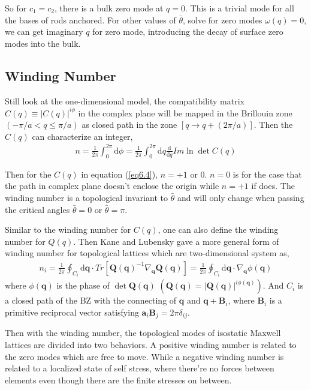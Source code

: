 \documentclass[aps,pre,preprint,groupedaddress]{revtex4-1}
\begin{document}
So for $c_1 = c_2$, there is a bulk zero mode at $q=0$. This is a trivial mode for all the bases of rods anchored. For other values of $\bar{\theta}$, solve for zero modes $\omega(q) = 0$, we can get imaginary $q$ for zero mode, introducing the decay of surface zero modes into the bulk.

\subsection{Winding Number}

Still look at the one-dimensional model, the compatibility matrix $C(q) \equiv |C(q)|^{i \phi}$ in the complex plane will be mapped in the Brillouin zone $(-\pi/a<q \leq \pi/a)$ as closed path in the zone $[q \rightarrow q+(2\pi/a)]$. Then the $C(q)$ can characterize an integer,
\begin{align}
n = \frac{1}{2\pi} \int_0^{2\pi} \mathrm{d}\phi = \frac{1}{2\pi} \int_0^{2\pi} \mathrm{d}q \frac{\mathrm{d}}{\mathrm{d}q} {Im \ln \det C(q)}
\end{align}

Then for the $C(q)$ in equation (\ref{eq6.4}), $n = +1$ or $0$. $n=0$ is for the case that the path in complex plane doesn't enclose the origin while $n=+1$ if does. The winding number is a topological invariant to $\bar{\theta}$ and will only change when passing the critical angles $\bar{\theta} = 0$ or $\bar{\theta} = \pi$. 

Similar to the winding number for $C(q)$, one can also define the winding number for $Q(q)$. Then Kane and Lubensky gave a more general form of winding number for topological lattices which are two-dimensional system as,
\begin{align}
n_i = \frac{1}{2\pi} \oint_{C_i} \mathrm{d}\mathbf{q} \cdot Tr[{\mathbf{Q}(\mathbf{q})^{-1}}\nabla_{\mathbf{q}}{\mathbf{Q}(\mathbf{q})}] = 
\frac{1}{2\pi} \oint_{C_i} \mathrm{d}\mathbf{q} \cdot \nabla_{\mathbf{q}}{\phi(\mathbf{q})}
\end{align}
where $\phi(\mathbf{q})$ is the phase of $\det \mathbf{Q}(\mathbf{q})$ $(\mathbf{Q}(\mathbf{q}) = |\mathbf{Q}(\mathbf{q})|^{i \phi(\mathbf{q})})$. And $C_i$ is a closed path of the BZ with the connecting of $\mathbf{q}$ and $\mathbf{q}+\mathbf{B}_i$, where $\mathbf{B}_i$ is a primitive reciprocal vector satisfying $\mathbf{a}_i\mathbf{B}_j = 2\pi \delta_{ij}$.

Then with the winding number, the topological modes of isostatic Maxwell lattices are divided into two behaviors. A positive winding number is related to the zero modes which are free to move. While a negative winding number is related to a localized state of self stress, where there're no forces between elements even though there are the finite stresses on between.
\end{document}
